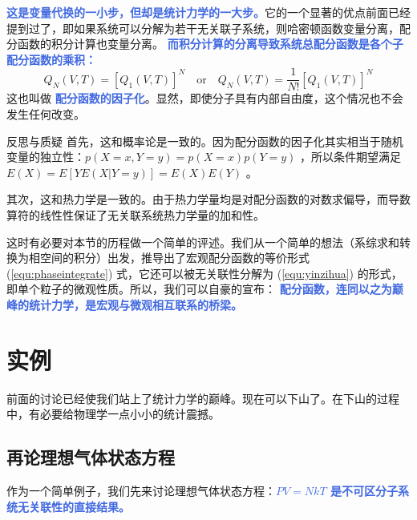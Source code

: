 \documentclass[hyperref,UTF-8]{ctexbook}
\newcommand{\0}{\boldsymbol{0}}
\begin{document}
\textcolor{RoyalBlue}{\textbf{\kaishu 这是变量代换的一小步，但却是统计力学的一大步。}}它的一个显著的优点前面已经提到过了，即如果系统可以分解为若干无关联子系统，则哈密顿函数变量分离，配分函数的积分计算也变量分离。 \textcolor{RoyalBlue}{\textbf{\kaishu  而积分计算的分离导致系统总配分函数是各个子配分函数的乘积：}}
\begin{equation}\label{equ:yinzihua}
    Q_N(V, T)=\left[Q_1(V, T)\right]^N \quad\text{or}\quad Q_N(V, T)=\frac{1}{N !}\left[Q_1(V, T)\right]^N
\end{equation}
这也叫做 \textcolor{RoyalBlue}{\textbf{\kaishu 配分函数的因子化}}。显然，即使分子具有内部自由度，这个情况也不会发生任何改变。

\begin{justification}{\kaishu 反思与质疑}
\kaishu \fontsize{11pt}{16pt}
    \quad\quad 首先，这和概率论是一致的。因为配分函数的因子化其实相当于随机变量的独立性：$p(X = x, Y = y) = p(X = x)p(Y = y)$ ，所以条件期望满足 $E(X) = E[YE(X|Y = y)] = E(X)E(Y)$ 。

    \quad\quad 其次，这和热力学是一致的。由于热力学量均是对配分函数的对数求偏导，而导数算符的线性性保证了无关联系统热力学量的加和性。
\end{justification}

这时有必要对本节的历程做一个简单的评述。我们从一个简单的想法（系综求和转换为相空间的积分）出发，推导出了宏观配分函数的等价形式 (\ref*{equ:phaseintegrate}) 式，它还可以被无关联性分解为 (\ref*{equ:yinzihua}) 的形式，即单个粒子的微观性质。所以，我们可以自豪的宣布： \textcolor{RoyalBlue}{\textbf{\kaishu 配分函数，连同以之为巅峰的统计力学，是宏观与微观相互联系的桥梁。}}

\section{实例}

前面的讨论已经使我们站上了统计力学的巅峰。现在可以下山了。在下山的过程中，有必要给物理学一点小小的统计震撼。

\subsection{再论理想气体状态方程}

作为一个简单例子，我们先来讨论理想气体状态方程：\textcolor{RoyalBlue}{\textbf{\kaishu $PV = NkT$ 是不可区分子系统无关联性的直接结果。}}
\end{document}
